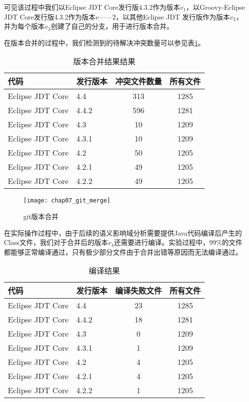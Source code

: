 可见该过程中我们以Eclipse JDT Core发行版4.3.2作为版本$v_1$，以Groovy-Eclipse JDT Core发行版4.3.2作为版本$v——2$，以其他Eclipse JDT 发行版作为版本$v_3$，并为每个版本$v_3$创建了自己的分支，用于进行版本合并。


在版本合并的过程中，我们检测到的待解决冲突数量可以参见表\ref {data_git_merge}。

\begin{table}
	\caption{版本合并结果结果}
	\label{data_git_merge}
	\centering
	\begin{tabular}{llcc}
		\toprule[1.5pt]
		{\heiti 代码} & {\heiti 发行版本} & {\heiti 冲突文件数量} & {\heiti 所有文件}\\\midrule[1pt]
		Eclipse JDT Core & 4.4 & 313 & 1285\\
		Eclipse JDT Core & 4.4.2 & 596 & 1281\\
		Eclipse JDT Core & 4.3 & 10 & 1209\\
		Eclipse JDT Core & 4.3.1 & 10 & 1209\\
		Eclipse JDT Core & 4.2 & 50 & 1205\\
		Eclipse JDT Core & 4.2.1 & 49 & 1205\\
		Eclipse JDT Core & 4.2.2 & 49 & 1205\\
		\bottomrule[1.5pt]
	\end{tabular}
\end{table}


\begin{figure}[H]
	\centering
	\texttt{[image: chap07\_git\_merge]}
	\caption {git版本合并}
	\label {exp_git_merge}	
\end{figure}

在实际操作过程中，由于后续的语义影响域分析需要提供Java代码编译后产生的Class文件，我们对于合并后的版本$v_4$还需要进行编译。实验过程中，99\%的文件都能够正常编译通过，只有极少部分文件由于合并出错等原因而无法编译通过。

\begin{table}
	\caption{编译结果}
	\label{data_git_merge2}
	\centering
	\begin{tabular}{llcc}
		\toprule[1.5pt]
		{\heiti 代码} & {\heiti 发行版本} & {\heiti 编译失败文件} & {\heiti 所有文件}\\\midrule[1pt]
		Eclipse JDT Core & 4.4 & 23 & 1285\\
		Eclipse JDT Core & 4.4.2 & 18 & 1281\\
		Eclipse JDT Core & 4.3 & 0 & 1209\\
		Eclipse JDT Core & 4.3.1 & 1 & 1209\\
		Eclipse JDT Core & 4.2 & 4 & 1205\\
		Eclipse JDT Core & 4.2.1 & 4 & 1205\\
		Eclipse JDT Core & 4.2.2 & 1 & 1205\\
		\bottomrule[1.5pt]
	\end{tabular}
\end{table}

